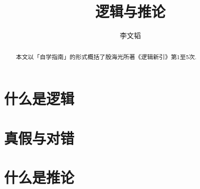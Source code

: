\documentclass{ctexart}
\author{李文韬}
\theoremstyle{definition}
\theoremstyle{plain}
\numberwithin{equation}{section}
\begin{document}
    
\title{逻辑与推论}

\maketitle

\begin{abstract}
    本文以「自学指南」的形式概括了殷海光所著《逻辑新引》第1至5次.
\end{abstract}

\tableofcontents

\section{什么是逻辑}
\section{真假与对错}
\section{什么是推论}
\printbibliography
\end{document}
